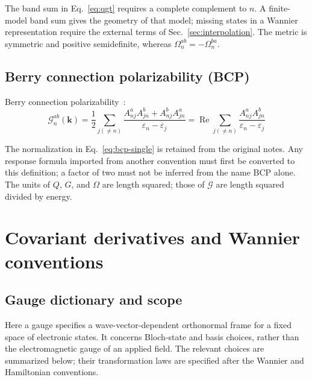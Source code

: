 \documentclass[prx,amsmath,amssymb,superscriptaddress,longbibliography]{revtex4-2}
\newcommand{\Rea}{\operatorname{Re}}
\begin{document}
The band sum in Eq.~\eqref{eq:qgt} requires a complete complement to $n$.
A finite-model band sum gives the geometry of that model; missing states in a
Wannier representation require the external terms of Sec.~\ref{sec:interpolation}.
The metric is symmetric and positive semidefinite, whereas
$\Omega_n^{ab}=-\Omega_n^{ba}$.

{
\subsection{Berry connection polarizability (BCP)}

Berry connection polarizability~\cite{GaoPRL2014FieldInducedPositional}: 
\begin{equation}
    \mathcal{G}_n^{ab}(\bm{k}) = \frac{1}{2} \sum_{j(\neq n)}  \frac{A_{nj}^a A_{jn}^b + A_{nj}^b A_{jn}^a}{\varepsilon_n - \varepsilon_j} = \Rea \sum_{j(\neq n)}  \frac{A_{nj}^a A_{jn}^b}{\varepsilon_n - \varepsilon_j}
\label{eq:bcp-single}\end{equation}

}
The normalization in Eq.~\eqref{eq:bcp-single} is retained from the original notes.
Any response formula imported from another convention must first be converted
to this definition; a factor of two must not be inferred from the name BCP alone.
The units of $Q$, $G$, and $\Omega$ are length squared; those of
$\mathcal{G}$ are length squared divided by energy.

\section{Covariant derivatives and Wannier conventions}
\label{sec:covariant}

\subsection{Gauge dictionary and scope}
\label{sec:gauge-dictionary}
Here a gauge specifies a wave-vector-dependent orthonormal frame for a fixed
space of electronic states. It concerns Bloch-state and basis choices,
rather than the electromagnetic gauge of an applied field.
The relevant choices are summarized below; their transformation laws are
specified after the Wannier and Hamiltonian conventions.
\end{document}
